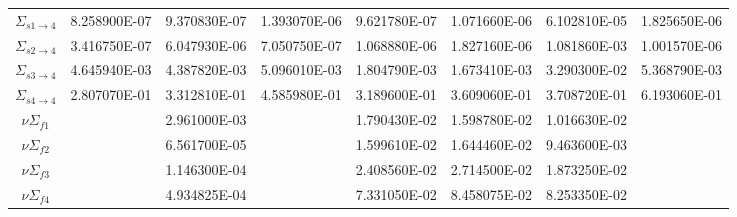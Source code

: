 \begin{landscape}
\begin{table}
\begin{center}
\begin{tabular}{cccccccc}
          $\Sigma_{s 1\rightarrow 4}$&8.258900E-07&9.370830E-07&1.393070E-06&9.621780E-07&1.071660E-06&6.102810E-05&1.825650E-06\\
          $\Sigma_{s 2\rightarrow 4}$&3.416750E-07&6.047930E-06&7.050750E-07&1.068880E-06&1.827160E-06&1.081860E-03&1.001570E-06\\
          $\Sigma_{s 3\rightarrow 4}$&4.645940E-03&4.387820E-03&5.096010E-03&1.804790E-03&1.673410E-03&3.290300E-02&5.368790E-03\\
          $\Sigma_{s 4\rightarrow 4}$&2.807070E-01&3.312810E-01&4.585980E-01&3.189600E-01&3.609060E-01&3.708720E-01&6.193060E-01\\
          $ \nu \Sigma_{f1}$&&2.961000E-03&&1.790430E-02&1.598780E-02&1.016630E-02&\\
          $ \nu \Sigma_{f2}$&&6.561700E-05&&1.599610E-02&1.644460E-02&9.463600E-03&\\
          $ \nu \Sigma_{f3}$&&1.146300E-04&&2.408560E-02&2.714500E-02&1.873250E-02&\\
          $ \nu \Sigma_{f4}$&&4.934825E-04&&7.331050E-02&8.458075E-02&8.253350E-02&\\
          \bottomrule
        \end{tabular}
      \end{center}
    \end{table}
    \end{landscape}
    \restoregeometry
    \pagestyle{plain}
    \thispagestyle{lscapedplain}
